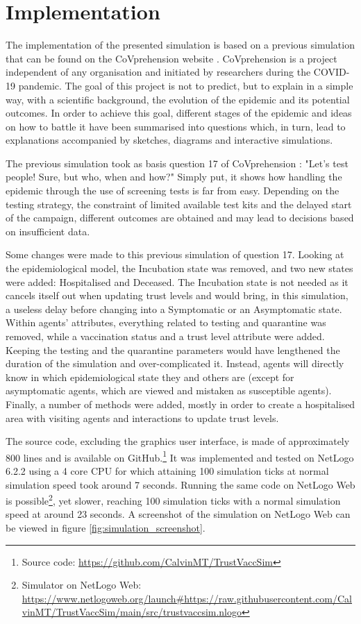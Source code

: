 \chapter{Implementation}

The implementation of the presented simulation is based on a previous simulation that can be found on the CoVprehension website \cite{covprehension_question_17_2020, adam:hal-03613433}. CoVprehension is a project independent of any organisation and initiated by researchers during the COVID-19 pandemic. The goal of this project is not to predict, but to explain in a simple way, with a scientific background, the evolution of the epidemic and its potential outcomes. In order to achieve this goal, different stages of the epidemic and ideas on how to battle it have been summarised into questions which, in turn, lead to explanations accompanied by sketches, diagrams and interactive simulations.

The previous simulation took as basis question 17 of CoVprehension \cite{covprehension_question_17_2020}: "Let{\textquoteright}s test people! Sure, but who, when and how?" Simply put, it shows how handling the epidemic through the use of screening tests is far from easy. Depending on the testing strategy, the constraint of limited available test kits and the delayed start of the campaign, different outcomes are obtained and may lead to decisions based on insufficient data.

Some changes were made to this previous simulation of question 17. Looking at the epidemiological model, the Incubation state was removed, and two new states were added: Hospitalised and Deceased. The Incubation state is not needed as it cancels itself out when updating trust levels and would bring, in this simulation, a useless delay before changing into a Symptomatic or an Asymptomatic state.
Within agents' attributes, everything related to testing and quarantine was removed, while a vaccination status and a trust level attribute were added. Keeping the testing and the quarantine parameters would have lengthened the duration of the simulation and over-complicated it. Instead, agents will directly know in which epidemiological state they and others are (except for asymptomatic agents, which are viewed and mistaken as susceptible agents). Finally, a number of methods were added, mostly in order to create a hospitalised area with visiting agents and interactions to update trust levels.

The source code, excluding the graphics user interface, is made of approximately 800 lines and is available on GitHub.\footnote{Source code: \url{https://github.com/CalvinMT/TrustVaccSim}} It was implemented and tested on NetLogo 6.2.2 using a 4 core CPU for which attaining 100 simulation ticks at normal simulation speed took around 7 seconds. Running the same code on NetLogo Web is possible\footnote{Simulator on NetLogo Web: \url{https://www.netlogoweb.org/launch\#https://raw.githubusercontent.com/CalvinMT/TrustVaccSim/main/src/trustvaccsim.nlogo}}, yet slower, reaching 100 simulation ticks with a normal simulation speed at around 23 seconds. A screenshot of the simulation on NetLogo Web can be viewed in figure \ref{fig:simulation_screenshot}.


